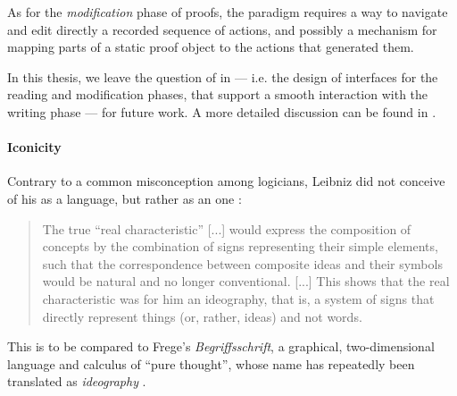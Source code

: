 As for the \emph{modification} phase of proofs, the  paradigm requires a
way to navigate and edit directly a recorded sequence of actions, and possibly a
mechanism for mapping parts of a static proof object to the actions that
generated them.

\begin{emphpar}
  In this thesis, we leave the question of  in  ---
  i.e. the design of interfaces for the reading and modification phases, that
  support a smooth interaction with the writing phase --- for future work. A
  more detailed discussion can be found in .
\end{emphpar}

\paragraph{Iconicity}


Contrary to a common misconception among logicians, Leibniz did not conceive of
his  as a  language, but rather as an
\emph{} one :
\begin{quote}
    The true ``real characteristic'' [...] would express the composition of
    concepts by the combination of signs representing their simple elements,
    such that the correspondence between composite ideas and their symbols would
    be natural and no longer conventional. [...] This shows that the real
    characteristic was for him an ideography, that is, a system of signs that
    directly represent things (or, rather, ideas) and not words.
\end{quote}
This is to be compared to Frege's \textit{Begriffsschrift}, a graphical,
two-dimensional language and calculus of ``pure thought'', whose name has
repeatedly been translated as \emph{ideography}
.

